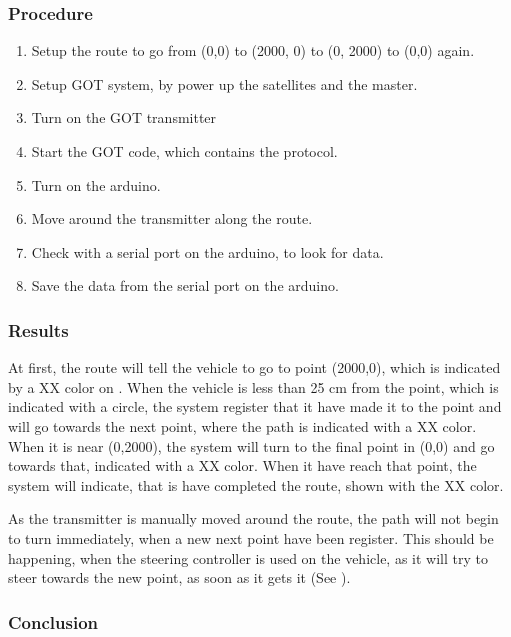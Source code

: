 \subsubsection{Procedure}

\begin{enumerate}
  \item Setup the route to go from (0,0) to (2000, 0) to (0, 2000) to (0,0) again.
  \item Setup GOT system, by power up the satellites and the master.
  \item Turn on the GOT transmitter
  \item Start the GOT code, which contains the protocol.
  \item Turn on the arduino.
  \item Move around the transmitter along the route.
  \item Check with a serial port on the arduino, to look for data.
  \item Save the data from the serial port on the arduino.
\end{enumerate}

\subsubsection{Results}

At first, the route will tell the vehicle to go to point (2000,0), which is indicated by a XX color on \figref{}. When the vehicle is less than 25 cm from the point, which is indicated with a circle, the system register that it have made it to the point and will go towards the next point, where the path is indicated with a XX color. When it is near (0,2000), the system will turn to the final point in (0,0) and go towards that, indicated with a XX color. When it have reach that point, the system will indicate, that is have completed the route, shown with the XX color. 

As the transmitter is manually moved around the route, the path will not begin to turn immediately, when a new next point have been register. This should be happening, when the steering controller is used on the vehicle, as it will try to steer towards the new point, as soon as it gets it (See \secref{} ).

\subsubsection{Conclusion}


